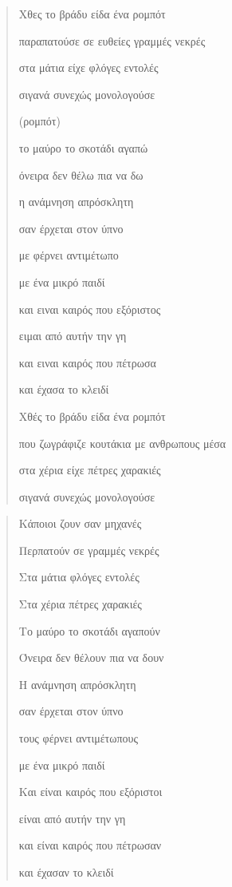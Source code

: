 \documentclass[12pt]{article}
\begin{document}
\begin{verse}
  Χθες το βράδυ είδα ένα ρομπότ

  παραπατούσε σε ευθείες γραμμές νεκρές

  στα μάτια είχε φλόγες εντολές

  σιγανά συνεχώς μονολογούσε

  (ρομπότ)

  το μαύρο το σκοτάδι αγαπώ

  όνειρα δεν θέλω πια να δω

  η ανάμνηση απρόσκλητη

  σαν έρχεται στον ύπνο

  με φέρνει αντιμέτωπο

  με ένα μικρό παιδί

  και ειναι καιρός που εξόριστος

  ειμαι από αυτήν την γη

  και ειναι καιρός που πέτρωσα

  και έχασα το κλειδί


  Χθές το βράδυ είδα ένα ρομπότ

  που ζωγράφιζε κουτάκια με ανθρωπους μέσα

  στα χέρια είχε πέτρες χαρακιές

  σιγανά συνεχώς μονολογούσε
\end{verse}

\begin{verse}
 Κάποιοι ζουν σαν μηχανές

 Περπατούν σε γραμμές νεκρές

 Στα μάτια φλόγες εντολές

 Στα χέρια πέτρες χαρακιές

 Το μαύρο το σκοτάδι αγαπούν

  Όνειρα δεν θέλουν πια να δουν

  H ανάμνηση απρόσκλητη

  σαν έρχεται στον ύπνο

 τους φέρνει αντιμέτωπους

  με ένα μικρό παιδί

  Και είναι καιρός που εξόριστοι

  είναι από αυτήν την γη

  και είναι καιρός που πέτρωσαν

  και έχασαν το κλειδί
\end{verse}

\begin{verse}


\end{verse}
\end{document}
